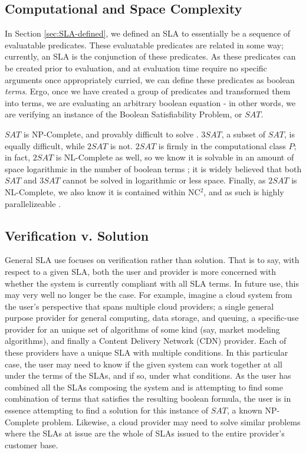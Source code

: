 \subsection{Computational and Space Complexity}
In Section \ref{sec:SLA-defined}, we defined an SLA to essentially be a sequence of evaluatable predicates.  These evaluatable predicates are related in some way; currently, an SLA is the conjunction of these predicates.  As these predicates can be created prior to evaluation, and at evaluation time require no specific arguments once appropriately curried, we can define these predicates as boolean {\it terms}.  Ergo, once we have created a group of predicates and transformed them into terms, we are evaluating an arbitrary boolean equation - in other words, we are verifying an instance of the Boolean Satisfiability Problem, or $ SAT $.

$ SAT $ is NP-Complete, and provably difficult to solve \cite{comptheory:sipser:intro-comp-theory}.  $ 3SAT $, a subset of $ SAT $, is equally difficult, while $ 2SAT $ is not.  $ 2SAT $ is firmly in the computational class $ P $; in fact, $ 2SAT $ is NL-Complete as well, so we know it is solvable in an amount of space logarithmic in the number of boolean terms \cite{comptheory:papadimitriou:computational-complexity}; it is widely believed that both $ SAT $ and $ 3SAT $ cannot be solved in logarithmic or less space.  Finally, as $ 2SAT $ is NL-Complete, we also know it is contained within NC$^{2}$, and as such is highly parallelizeable \cite{comptheory:papadimitriou:computational-complexity}.

\subsection{Verification v. Solution}
General SLA use focuses on verification rather than solution.  That is to say, with respect to a given SLA, both the user and provider is more concerned with whether the system is currently compliant with all SLA terms.  In future use, this may very well no longer be the case.  For example, imagine a cloud system from the user's perspective that spans multiple cloud providers; a single general purpose provider for general computing, data storage, and queuing, a specific-use provider for an unique set of algorithms of some kind (say, market modeling algorithms), and finally a Content Delivery Network (CDN) provider.  Each of these providers have a unique SLA with multiple conditions.  In this particular case, the user may need to know if the given system can work together at all under the terms of the SLAs, and if so, under what conditions.  As the user has combined all the SLAs composing the system and is attempting to find some combination of terms that satisfies the resulting boolean formula, the user is in essence attempting to find a solution for this instance of $ SAT $, a known NP-Complete problem.  Likewise, a cloud provider may need to solve similar problems where the SLAs at issue are the whole of SLAs issued to the entire provider's customer base.

